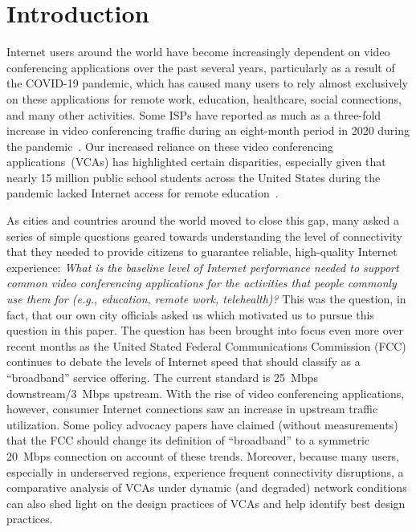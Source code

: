\section{Introduction}\label{sec:intro}

Internet users around the world have become increasingly dependent on video
conferencing applications over the past several years, particularly as a
result of the COVID-19 pandemic, which has caused many users to rely almost
exclusively on these applications for remote work, education, healthcare,
social connections, and many other activities.  Some ISPs have reported as
much as a three-fold increase in video conferencing traffic during an
eight-month period in 2020 during the pandemic~\cite{bitag_report}. Our
increased reliance on these video conferencing applications~(VCAs) has highlighted
certain disparities, especially given that nearly 15 million
public school students across the United States during the pandemic lacked
Internet access for remote education~\cite{common_sense_report}. 

As cities and countries around the world moved to close this gap, many asked a
series of simple questions geared towards understanding the level of
connectivity that they needed to provide citizens to guarantee reliable,
high-quality Internet experience: {\em What is the baseline level of Internet
performance needed to support common video conferencing applications for the
activities that people commonly use them for (e.g., education, remote work,
telehealth)?} This was the question, in fact, that our own city officials
asked us which motivated us to pursue this question in this paper. The question
has been brought into focus even more over recent months as the United Stated
Federal Communications Commission (FCC) continues to debate the levels of
Internet speed that should classify as a ``broadband'' service offering. The
current standard is 25~Mbps downstream/3~Mbps upstream. With the rise of video
conferencing applications, however, consumer Internet connections saw an
increase in upstream traffic utilization. Some policy advocacy papers have
claimed (without measurements) that the FCC should change its definition
of ``broadband'' to a symmetric 20~Mbps connection on account of these trends.
Moreover, because many users, especially in underserved regions, experience
frequent connectivity disruptions, a comparative analysis of VCAs under
dynamic (and degraded) network conditions can also shed light on the design
practices of VCAs and help identify best design practices.

